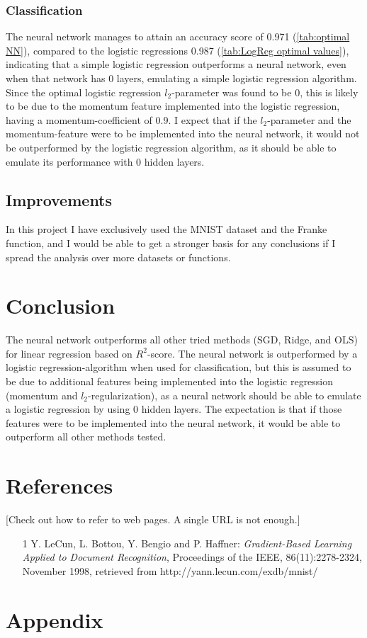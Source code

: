 \documentclass[a4paper, UKenglish]{article}
\newcommand{\0}{\mathbf{0}}
\newcommand{\1}{\mathbf{1}}
\begin{document}
\subsubsection{Classification}
The neural network manages to attain an accuracy score of 0.971 (\autoref{tab:optimal NN}), compared to the logistic regressions 0.987 (\autoref{tab:LogReg optimal values}), indicating that a simple logistic regression outperforms a neural network, even when that network has 0 layers, emulating a simple logistic regression algorithm. Since the optimal logistic regression $l_2$-parameter was found to be 0, this is likely to be due to the momentum feature implemented into the logistic regression, having a momentum-coefficient of 0.9. I expect that if the $l_2$-parameter and the momentum-feature were to be implemented into the neural network, it would not be outperformed by the logistic regression algorithm, as it should be able to emulate its performance with 0 hidden layers.

\subsection{Improvements}
In this project I have exclusively used the MNIST dataset and the Franke function, and I would be able to get a stronger basis for any conclusions if I spread the analysis over more datasets or functions.


\section{Conclusion}
The neural network outperforms all other tried methods (SGD, Ridge, and OLS) for linear regression based on $R^2$-score. The neural network is outperformed by a logistic regression-algorithm when used for classification, but this is assumed to be due to additional features being implemented into the logistic regression (momentum and $l_2$-regularization), as a neural network should be able to emulate a logistic regression by using 0 hidden layers. The expectation is that if those features were to be implemented into the neural network, it would be able to outperform all other methods tested.

\section{References}
[Check out how to refer to web pages. A single URL is not enough.]
\begin{itemize}
\item [1] Y. LeCun, L. Bottou, Y. Bengio and P. Haffner: \textit{Gradient-Based Learning Applied to Document Recognition}, Proceedings of the IEEE, 86(11):2278-2324, November 1998, retrieved from http://yann.lecun.com/exdb/mnist/
\end{itemize}


\section{Appendix}
\end{document}
